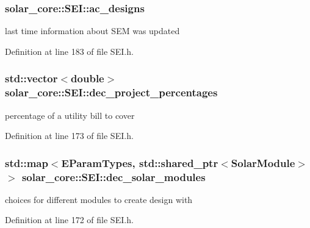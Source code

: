 \subsubsection[{ac\+\_\+designs}]{ solar\+\_\+core\+::\+S\+E\+I\+::ac\+\_\+designs\hspace{0.3cm}{\ttfamily [protected]}}\label{classsolar__core_1_1_s_e_i_a147ec60ca551d9195cdf5937eda5f903}
last time information about S\+E\+M was updated 

Definition at line 183 of file S\+E\+I.\+h.

\hypertarget{classsolar__core_1_1_s_e_i_a272838ea17b8cd4e49c9a8c53facfd8f}{}
\subsubsection[{dec\+\_\+project\+\_\+percentages}]{\setlength{\rightskip}{0pt plus 5cm}std\+::vector$<$double$>$ solar\+\_\+core\+::\+S\+E\+I\+::dec\+\_\+project\+\_\+percentages\hspace{0.3cm}{\ttfamily [protected]}}\label{classsolar__core_1_1_s_e_i_a272838ea17b8cd4e49c9a8c53facfd8f}
percentage of a utility bill to cover 

Definition at line 173 of file S\+E\+I.\+h.

\hypertarget{classsolar__core_1_1_s_e_i_a79728143af5752e09c2be29cfa1cfd8f}{}
\subsubsection[{dec\+\_\+solar\+\_\+modules}]{\setlength{\rightskip}{0pt plus 5cm}std\+::map$<${\bf E\+Param\+Types}, std\+::shared\+\_\+ptr$<${\bf Solar\+Module}$>$ $>$ solar\+\_\+core\+::\+S\+E\+I\+::dec\+\_\+solar\+\_\+modules\hspace{0.3cm}{\ttfamily [protected]}}\label{classsolar__core_1_1_s_e_i_a79728143af5752e09c2be29cfa1cfd8f}
choices for different modules to create design with 

Definition at line 172 of file S\+E\+I.\+h.

